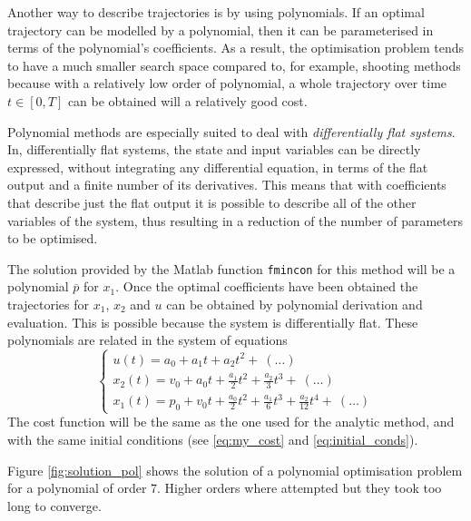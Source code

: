 \par Another way to describe trajectories is by using polynomials. If an optimal trajectory can be modelled by a polynomial, then it can be parameterised in terms of the polynomial's coefficients. As a result, the optimisation problem tends to have a much smaller search space compared to, for example, shooting methods because with a relatively low order of polynomial, a whole trajectory over time $t\in [0,T]$ can be obtained will a relatively good cost. 
\par Polynomial methods are especially suited to deal with \textit{differentially flat systems}\cite{sabetghadam2018cooperative}.   In, differentially flat systems, the state and input variables can be directly expressed, without integrating any differential equation, in terms of the flat output and a finite number of its derivatives\cite{fliess1995flatness}. This means that with coefficients that describe just the flat output it is possible to describe all of the other variables of the system, thus resulting in a reduction of the number of parameters to be optimised.

\par The solution provided by the Matlab function \texttt{fmincon} for this method will be a polynomial $\overline{p}$ for $x_1$. Once the optimal coefficients have been obtained the trajectories for $x_1$, $x_2$ and $u$ can be obtained by polynomial derivation and evaluation. This is possible because the system is differentially flat. These polynomials are related in the system of equations
\begin{equation}
    \label{eq:polys_of_double_integrator}
    \begin{cases}
        u (t) = a_0 + a_1 t + a_2 t^2 + \ (\dots) \\
        x_2 (t) = v_0 + a_0 t + \frac{a_1}{2} t^2 + \frac{a_2}{3} t^3 + \ (\dots)  \\
        x_1 (t) = p_0 + v_0 t + \frac{a_0}{2} t^2 + \frac{a_1}{6} t^3 + \frac{a_2}{12} t^4 + \ (\dots)
    \end{cases}
\end{equation}
 The cost function will be the same as the one used for the analytic method, and with the same initial conditions (see \ref{eq:my_cost} and \ref{eq:initial_conds}).
\par Figure \ref{fig:solution_pol} shows the solution of a polynomial optimisation problem for a polynomial of order 7. Higher orders where attempted but they took too long to converge. %


